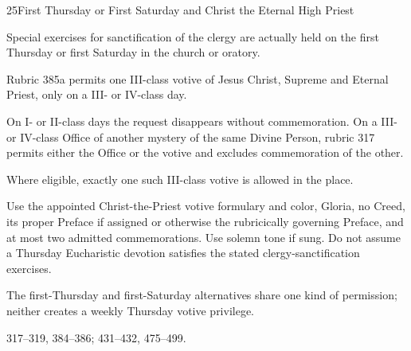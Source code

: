 \begin{casefile}{25}{First Thursday or First Saturday and Christ the Eternal High Priest}
\item[Calendar facts] Special exercises for sanctification of the clergy are actually held on the first Thursday or first Saturday in the church or oratory.
\item[Ranks and rows] Rubric 385a permits one III-class votive of Jesus Christ, Supreme and Eternal Priest, only on a III- or IV-class day.
\item[Impeded item] On I- or II-class days the request disappears without commemoration.  On a III- or IV-class Office of another mystery of the same Divine Person, rubric 317 permits either the Office or the votive and excludes commemoration of the other.
\item[Mass category] Where eligible, exactly one such III-class votive is allowed in the place.
\item[Assembly] Use the appointed Christ-the-Priest votive formulary and color, Gloria, no Creed, its proper Preface if assigned or otherwise the rubricically governing Preface, and at most two admitted commemorations.  Use solemn tone if sung.  Do not assume a Thursday Eucharistic devotion satisfies the stated clergy-sanctification exercises.
\item[Boundary] The first-Thursday and first-Saturday alternatives share one kind of permission; neither creates a weekly Thursday votive privilege.
\item[Rubric locus] 317--319, 384--386; 431--432, 475--499.
\end{casefile}

